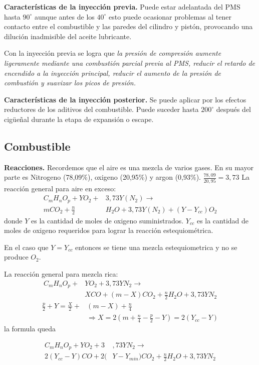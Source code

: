 {\bf Características de la inyección previa.}
Puede estar adelantada del PMS hasta $90^\circ$ aunque antes de los $40^\circ$ esto puede ocasionar problemas al tener contacto entre el combustible y las paredes del cilindro y pistón, provocando una dilución inadmisible del aceite lubricante.

Con la inyección previa se logra que \emph{la presión de compresión aumente ligeramente mediante una combustión parcial previa al PMS, reducir el retardo de encendido a la inyección principal, reducir el aumento de la presión de combustión y suavizar los picos de presión.}

{\bf Características de la inyección posterior.}
Se puede aplicar por los efectos reductores de los aditivos del combustible. Puede suceder hasta $200^\circ$ después del cigüeñal durante la etapa de expansión o escape.

\subsection{Combustible}
{\bf Reacciones.}
Recordemos que el aire es una mezcla de varios gases. En su mayor parte es Nitrogeno (78,09\%), oxigeno (20,95\%) y argon (0,93\%). $\frac{78,09}{20,95}=3,73$  
La reacción general para aire en exceso:
\begin{align*}
C_m H_n O_p+Y O_2+&3,73Y(N_2)\longrightarrow \\ mCO_2 +\tfrac{n}{2}& H_2O +3,73 Y (N_2)+(Y-Y_{cc})O_2
\end{align*}
donde $Y$ es la cantidad de moles de oxigeno suministrados. $Y_{cc}$ es la cantidad de moles de oxigeno requeridos para lograr la reacción estequiométrica.

En el caso que $Y=Y_{cc}$ entonces se tiene una mezcla estequiometrica y no se produce $O_2$.

La reacción general para mezcla rica:
\begin{align*}
C_mH_nO_p+&YO_2+3,73YN_2\longrightarrow \\ &XCO+(m-X)CO_2+\tfrac{n}{2}H_2O+3,73YN_2
\end{align*}
\begin{align*}
\frac{p}{2}+Y=\frac{X}{2}+&(m-X)+\frac{n}{4}\\
&\Rightarrow X=2\left(m+\frac{n}{4}-\frac{p}{2}-Y \right)=2(Y_{cc}-Y)
\end{align*}
la formula queda 

\begin{align*}
C_mH_nO_p + YO_2+3&,73YN_2\longrightarrow \\  2(Y_{cc}-Y)CO+2(&Y -Y_{min})CO_2+\tfrac{n}{2}H_2O+3,73YN_2
\end{align*}

